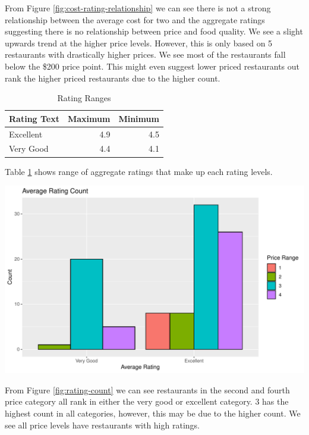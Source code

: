 \documentclass[11pt,a4paper,]{article}
\let\origfigure\figure
\let\endorigfigure\endfigure
\renewenvironment{figure}[1][2] {
    \expandafter\origfigure\expandafter[H]
} {
    \endorigfigure
}%
\begin{document}
From Figure \ref{fig:cost-rating-relationship} we can see there is not a strong relationship between the average cost for two and the aggregate ratings suggesting there is no relationship between price and food quality. We see a slight upwards trend at the higher price levels. However, this is only based on 5 restaurants with drastically higher prices. We see most of the restaurants fall below the \$200 price point. This might even suggest lower priced restaurants out rank the higher priced restaurants due to the higher count.

\begin{table}[!h]

\caption{\label{tab:rating-ranges}Rating Ranges}
\centering
\begin{tabular}[t]{l|r|r}
\hline
Rating Text & Maximum & Minimum\\
\hline
Excellent & 4.9 & 4.5\\
\hline
Very Good & 4.4 & 4.1\\
\hline
\end{tabular}
\end{table}

Table \ref{tab:rating-ranges} shows range of aggregate ratings that make up each rating levels.

\begin{figure}
\centering
\includegraphics{assignment4_files/figure-latex/rating-count-1.pdf}
\caption{\label{fig:rating-count}Average Rating Count}
\end{figure}

From Figure \ref{fig:rating-count} we can see restaurants in the second and fourth price category all rank in either the very good or excellent category. 3 has the highest count in all categories, however, this may be due to the higher count. We see all price levels have restaurants with high ratings.
\end{document}
